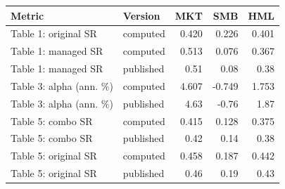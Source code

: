 \begin{tabular}{llrrr}\toprule
Metric & Version & MKT & SMB & HML \\ \midrule
Table 1: original SR & computed & 0.420 & 0.226 & 0.401 \\
Table 1: managed SR & computed & 0.513 & 0.076 & 0.367 \\
Table 1: managed SR & published & 0.51 & 0.08 & 0.38 \\
\midrule
Table 3: alpha (ann. \%) & computed & 4.607 & -0.749 & 1.753 \\
Table 3: alpha (ann. \%) & published & 4.63 & -0.76 & 1.87 \\
\midrule
Table 5: combo SR & computed & 0.415 & 0.128 & 0.375 \\
Table 5: combo SR & published & 0.42 & 0.14 & 0.38 \\
Table 5: original SR & computed & 0.458 & 0.187 & 0.442 \\
Table 5: original SR & published & 0.46 & 0.19 & 0.43 \\
\bottomrule\end{tabular}
